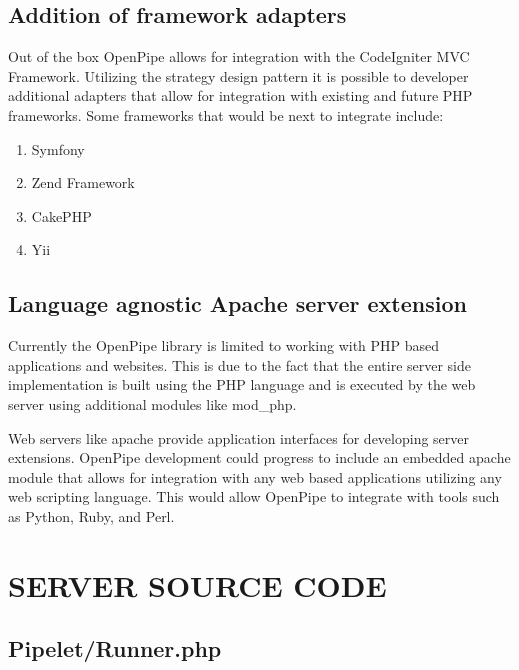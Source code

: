 \documentclass[12pt]{report}
\renewcommand{\cftchappresnum}{CHAPTER }
\newcommand{\rootPath}{../../}
\newcommand{\rootServerPath}{\rootPath server/}
\newcommand{\rootServerPhpPath}{\rootServerPath php/}
\newcommand{\phplist}[1]{}
\begin{document}
\section{Addition of framework adapters}
Out of the box OpenPipe allows for integration with the CodeIgniter MVC Framework. Utilizing the strategy design pattern it is possible to developer additional adapters that allow for integration with existing and future PHP frameworks. Some frameworks that would be next to integrate include:

\begin{enumerate}
	\item Symfony
	\item Zend Framework
	\item CakePHP
	\item Yii
\end{enumerate}

\section{Language agnostic Apache server extension}
Currently the OpenPipe library is limited to working with PHP based applications and websites. This is due to the fact that the entire server side implementation is built  using the PHP language and is executed by the web server using additional modules like mod\_php. 

Web servers like apache provide application interfaces for developing server extensions. OpenPipe development could progress to include an embedded apache module that allows for integration with any web based applications utilizing any web scripting language. This would allow OpenPipe to integrate with tools such as Python, Ruby, and Perl.




\appendix
\singlespacing
\addtocontents{toc}{\def\protect\cftchappresnum{APPENDIX }}

\chapter{SERVER SOURCE CODE}
\section{Pipelet/Runner.php}
\phplist{OpenPipe/Runner.php}
\end{document}
